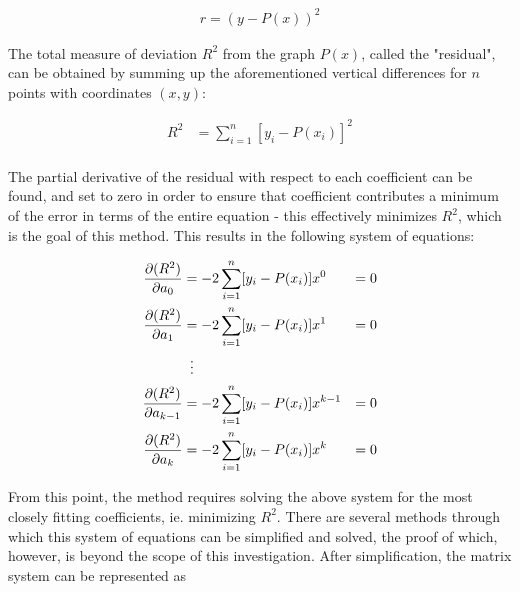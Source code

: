 \documentclass[12pt, a4paper]{article}
\begin{document}
\begin{align*}
    r=(y-P(x))^2
\end{align*}

The total measure of deviation $R^2$ from the graph $P(x)$, called the
"residual", can be obtained by summing up the aforementioned vertical
differences for $n$ points with coordinates $(x, y)$:

\begin{align*}
    R^2 & = \sum^n_{i=1}[y_i-P(x_i)]^2 \\
\end{align*}

The partial derivative of the residual with respect to each coefficient can be
found, and set to zero in order to ensure that coefficient contributes a minimum
of the error in terms of the entire equation - this effectively minimizes $R^2$,
which is the goal of this method. This results in the following system of
equations:

\begin{align*}
    \frac{\partial (R^2)}{\partial a_0}     & = -2 \sum^n_{i=1}[y_i-P(x_i)] x^0     & = 0 \\
    \frac{\partial (R^2)}{\partial a_1}     & = -2 \sum^n_{i=1}[y_i-P(x_i)] x^1     & = 0 \\
                                            & \vdotswithin{=}                             \\
    \frac{\partial (R^2)}{\partial a_{k-1}} & = -2 \sum^n_{i=1}[y_i-P(x_i)] x^{k-1} & = 0 \\
    \frac{\partial (R^2)}{\partial a_k}     & = -2 \sum^n_{i=1}[y_i-P(x_i)] x^k     & = 0
\end{align*}

From this point, the method requires solving the above system for the most
closely fitting coefficients, ie. minimizing $R^2$. There are several methods
through which this system of equations can be simplified and solved, the proof
of which, however, is beyond the scope of this investigation. After
simplification, the matrix system can be represented as
\end{document}
